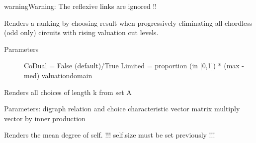 \documentclass[letterpaper,10pt,english]{sphinxmanual}
\begin{document}
\begin{fulllineitems}
\begin{fulllineitems}
\begin{notice}{warning}{Warning:}
The reflexive links are ignored !!
\end{notice}

\end{fulllineitems}


\begin{fulllineitems}
\label{techDoc:digraphs.Digraph.iterateRankingByChoosing}
Renders a ranking by choosing result when progressively eliminating
all chordless (odd only) circuits with rising valuation cut levels.
\begin{description}
\item[{Parameters}] \leavevmode
CoDual = False (default)/True
Limited = proportion (in {[}0,1{]}) * (max - med) valuationdomain

\end{description}

\end{fulllineitems}


\begin{fulllineitems}
\label{techDoc:digraphs.Digraph.kChoices}
Renders all choices of length k from set A

\end{fulllineitems}


\begin{fulllineitems}
\label{techDoc:digraphs.Digraph.matmult2}
Parameters: digraph relation and choice characteristic vector
matrix multiply vector by inner production

\end{fulllineitems}


\begin{fulllineitems}
\label{techDoc:digraphs.Digraph.meanDegree}
Renders the mean degree of self.
!!! self.size must be set previously !!!


\end{fulllineitems}
\end{fulllineitems}
\end{document}
